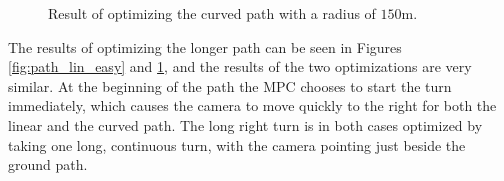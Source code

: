 \begin{figure}
	\caption{Result of optimizing the curved path with a radius of $150$m.}
	\label{fig:path_cur_easy}
\end{figure}

The results of optimizing the longer path can be seen in Figures \ref{fig:path_lin_easy} and \ref{fig:path_cur_easy}, and the results of the two optimizations are very similar. At the beginning of the path the MPC chooses to start the turn immediately, which causes the camera to move quickly to the right for both the linear and the curved path. The long right turn is in both cases optimized by taking one long, continuous turn, with the camera pointing just beside the ground path.

